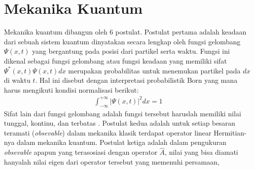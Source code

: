 \section{Mekanika Kuantum}
Mekanika kuantum dibangun oleh 6 postulat. Postulat pertama adalah keadaan dari sebuah sistem kuantum dinyatakan secara lengkap oleh fungsi gelombang \(\Psi(x,t)\) yang bergantung pada posisi dari partikel serta waktu. Fungsi ini dikenal sebagai fungsi gelombang atau fungsi keadaan yang memiliki sifat \(\Psi^*(x,t)\Psi(x,t)dx\) merupakan probabilitas untuk menemukan partikel pada \(dx\) di waktu \(t\). Hal ini disebut dengan interpretasi probabilistik Born yang mana harus mengikuti kondisi normalisasi berikut:
\begin{align}
    \int_{-\infty}^{+\infty}|\Psi(x,t)|^2 dx = 1 \label{eq:TotalProbability}
\end{align}
Sifat lain dari fungsi gelombang adalah fungsi tersebut haruslah memiliki nilai tunggal, kontinu, dan terbatas \cite{Peres2004Quantum}.
Postulat kedua adalah untuk setiap besaran teramati (\textit{obsevable}) dalam mekanika klasik terdapat operator linear Hermitian-nya dalam mekanika kuantum. Postulat ketiga adalah dalam pengukuran \textit{obsevable} apapun yang terasosiasi dengan operator \(\hat{A}\), nilai yang bisa diamati hanyalah nilai eigen dari operator tersebut yang memenuhi persamaan,
